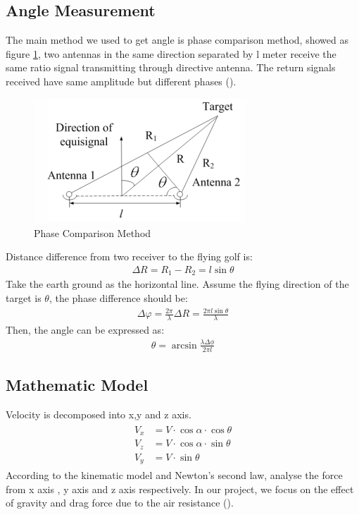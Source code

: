 \subsection{Angle Measurement}
The main method we used to get angle is phase comparison method, showed as figure \ref{fig:phase}, two antennas in the same direction separated by l meter receive the same ratio signal transmitting through directive antenna. The return signals received have same amplitude but different phases (\cite{li2015simulation}).
\begin{figure}[H]
    \centering
    \includegraphics[width=8cm]{figure/phase.png}
    \caption{Phase Comparison Method}
    \label{fig:phase}
\end{figure}
Distance difference from two receiver to the flying golf is:
\begin{align}
    \Delta R=R_{1}-R_{2}=l \sin \theta
\end{align}
Take the earth ground as the horizontal line. Assume the flying direction of the target is $\theta$, the phase difference should be:
\begin{align}
\Delta \varphi=\frac{2 \pi}{\lambda} \Delta R=\frac{2 \pi l \sin \theta}{\lambda}
\end{align}
Then, the angle can be expressed as:
\begin{align}
 \theta=\arcsin \frac{\lambda \Delta \phi}{2 \pi l}   
\end{align}

\subsection{Mathematic Model}
Velocity is decomposed into x,y and z axis.
\begin{align}
\begin{split}
    V_{x}&=V \cdot \cos \alpha \cdot \cos \theta\\
    V_{z}&=V \cdot \cos \alpha \cdot \sin \theta\\
    V_{y}&=V \cdot \sin \theta    
\end{split}
\end{align}
According to the kinematic model and Newton’s second law, analyse the force from x axis , y axis and z axis respectively. In our project, we focus on the effect of gravity and drag force due to the air resistance  (\cite{AirResistanceModels}).\\

